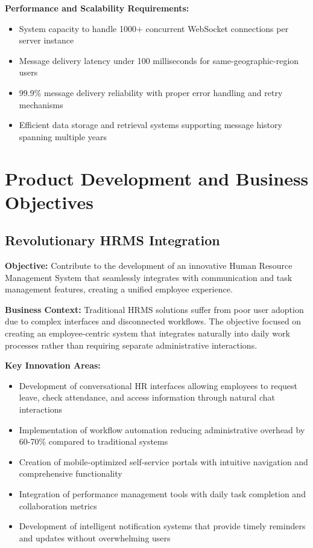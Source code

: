 \textbf{Performance and Scalability Requirements:}
\begin{itemize}
    \item System capacity to handle 1000+ concurrent WebSocket connections per server instance
    \item Message delivery latency under 100 milliseconds for same-geographic-region users
    \item 99.9\% message delivery reliability with proper error handling and retry mechanisms
    \item Efficient data storage and retrieval systems supporting message history spanning multiple years
\end{itemize}

\section{Product Development and Business Objectives}

\subsection{Revolutionary HRMS Integration}

\textbf{Objective:} Contribute to the development of an innovative Human Resource Management System that seamlessly integrates with communication and task management features, creating a unified employee experience.

\textbf{Business Context:} Traditional HRMS solutions suffer from poor user adoption due to complex interfaces and disconnected workflows. The objective focused on creating an employee-centric system that integrates naturally into daily work processes rather than requiring separate administrative interactions.

\textbf{Key Innovation Areas:}
\begin{itemize}
    \item Development of conversational HR interfaces allowing employees to request leave, check attendance, and access information through natural chat interactions
    \item Implementation of workflow automation reducing administrative overhead by 60-70\% compared to traditional systems
    \item Creation of mobile-optimized self-service portals with intuitive navigation and comprehensive functionality
    \item Integration of performance management tools with daily task completion and collaboration metrics
    \item Development of intelligent notification systems that provide timely reminders and updates without overwhelming users
\end{itemize}

